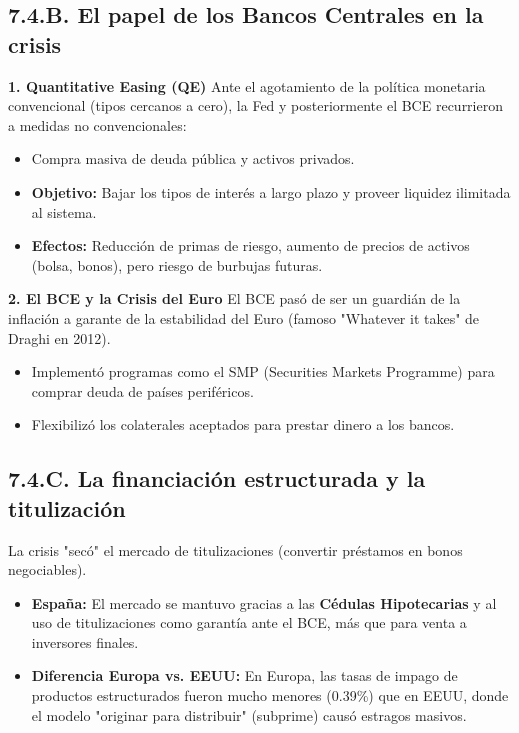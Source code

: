 \documentclass[a4paper,12pt]{report}
\theoremstyle{ejerciciostyle}
\begin{document}
\subsection{7.4.B. El papel de los Bancos Centrales en la crisis}

\textbf{1. Quantitative Easing (QE)}
Ante el agotamiento de la política monetaria convencional (tipos cercanos a cero), la Fed y posteriormente el BCE recurrieron a medidas no convencionales:
\begin{itemize}
    \item Compra masiva de deuda pública y activos privados.
    \item \textbf{Objetivo:} Bajar los tipos de interés a largo plazo y proveer liquidez ilimitada al sistema.
    \item \textbf{Efectos:} Reducción de primas de riesgo, aumento de precios de activos (bolsa, bonos), pero riesgo de burbujas futuras.
\end{itemize}

\textbf{2. El BCE y la Crisis del Euro}
El BCE pasó de ser un guardián de la inflación a garante de la estabilidad del Euro (famoso "Whatever it takes" de Draghi en 2012).
\begin{itemize}
    \item Implementó programas como el SMP (Securities Markets Programme) para comprar deuda de países periféricos.
    \item Flexibilizó los colaterales aceptados para prestar dinero a los bancos.
\end{itemize}

\subsection{7.4.C. La financiación estructurada y la titulización}
La crisis "secó" el mercado de titulizaciones (convertir préstamos en bonos negociables).
\begin{itemize}
    \item \textbf{España:} El mercado se mantuvo gracias a las \textbf{Cédulas Hipotecarias} y al uso de titulizaciones como garantía ante el BCE, más que para venta a inversores finales.
    \item \textbf{Diferencia Europa vs. EEUU:} En Europa, las tasas de impago de productos estructurados fueron mucho menores (0.39\%) que en EEUU, donde el modelo "originar para distribuir" (subprime) causó estragos masivos.
\end{itemize}
\end{document}
